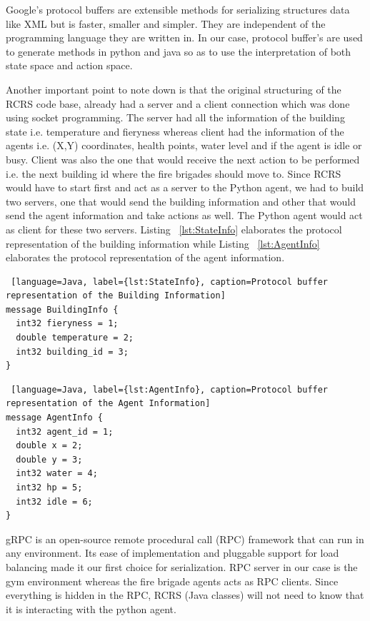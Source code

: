 \documentclass[12pt]{report}
\begin{document}
Google's protocol buffers are extensible methods for serializing structures data like XML but is faster, smaller and simpler. They are independent of the programming language they are written in. In our case, protocol buffer's are used to generate methods in python and java so as to use the interpretation of both state space and action space. 

Another important point to note down is that the original structuring of the RCRS code base, already had a server and a client connection which was done using socket programming. The server had all the information of the building state i.e. temperature and fieryness whereas client had the information of the agents i.e. (X,Y) coordinates, health points, water level and if the agent is idle or busy. Client was also the one that would receive the next action to be performed i.e. the next building id where the fire brigades should move to. Since RCRS would have to start first and act as a server to the Python agent, we had to build two servers, one that would send the building information and other that would send the agent information and take actions as well. The Python agent would act as client for these two servers. Listing ~\ref{lst:StateInfo} elaborates the protocol representation of the building information while Listing ~\ref{lst:AgentInfo} elaborates the protocol representation of the agent information. 

\begin{lstlisting} [language=Java, label={lst:StateInfo}, caption=Protocol buffer representation of the Building Information] 
message BuildingInfo {
  int32 fieryness = 1;
  double temperature = 2;
  int32 building_id = 3;
}
\end{lstlisting}

\begin{lstlisting} [language=Java, label={lst:AgentInfo}, caption=Protocol buffer representation of the Agent Information] 
message AgentInfo {
  int32 agent_id = 1;
  double x = 2;
  double y = 3; 
  int32 water = 4;
  int32 hp = 5; 
  int32 idle = 6;
}
\end{lstlisting}

gRPC is an open-source remote procedural call (RPC) framework that can run in any environment. Its ease of implementation and pluggable support for load balancing made it our first choice for serialization. 
RPC server in our case is the gym environment whereas the fire brigade agents acts as RPC clients. Since everything is hidden in the RPC, RCRS (Java classes) will not need to know that it is interacting with the python agent. 
\end{document}
